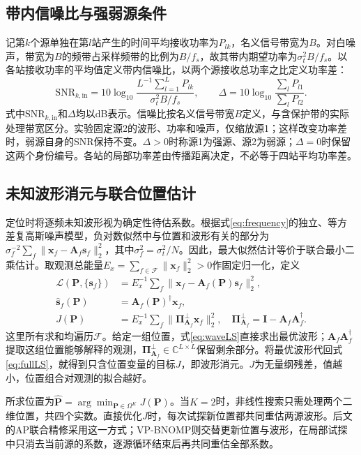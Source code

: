 \documentclass[a4paper,fleqn]{cas-sc}
\numberwithin{equation}{section}
\numberwithin{figure}{section}
\numberwithin{table}{section}
\newcommand{\C}{\mathbb C}
\begin{document}
\subsection{带内信噪比与强弱源条件}
记第$k$个源单独在第$l$站产生的时间平均接收功率为$P_{lk}$，名义信号带宽为$B$。对白噪声，带宽为$B$的频带占采样频带的比例为$B/f_s$，故其带内期望功率为$\sigma_t^2B/f_s$。以各站接收功率的平均值定义带内信噪比，以两个源接收总功率之比定义功率差：
\begin{equation}
 \mathrm{SNR}_{k,\mathrm{in}}
 =10\log_{10}\frac{L^{-1}\sum_{l=1}^L P_{lk}}
 {\sigma_t^2B/f_s},\qquad
 \Delta=10\log_{10}\frac{\sum_l P_{l1}}{\sum_l P_{l2}} .
 \label{eq:snr}
\end{equation}
式中$\mathrm{SNR}_{k,\mathrm{in}}$和$\Delta$均以dB表示。信噪比按名义信号带宽$B$定义，与含保护带的实际处理带宽区分。实验固定源2的波形、功率和噪声，仅缩放源1；这样改变功率差时，弱源自身的SNR保持不变。$\Delta>0$时称源1为强源、源2为弱源；$\Delta=0$时保留这两个身份编号。各站的局部功率差由传播距离决定，不必等于四站平均功率差。

\subsection{未知波形消元与联合位置估计}
定位时将逐频未知波形视为确定性待估系数。根据式\eqref{eq:frequency}的独立、等方差复高斯噪声模型，负对数似然中与位置和波形有关的部分为$\sigma_f^{-2}\sum_f\|\bm x_f-\bm A_f\bm s_f\|_2^2$，其中$\sigma_f^2=\sigma_t^2/N$。因此，最大似然估计等价于联合最小二乘估计\cite{ChenHudsonYao2002}。取观测总能量$E_x=\sum_{f\in\mathcal F}\|\bm x_f\|_2^2>0$作固定归一化，定义
\begin{align}
 \mathcal L(\bm P,\{\bm s_f\})
   &=E_x^{-1}\sum_f\|\bm x_f-\bm A_f(\bm P)\bm s_f\|_2^2,\label{eq:fullLS}\\
 \widehat{\bm s}_f(\bm P)&=\bm A_f(\bm P)^\dagger\bm x_f,\label{eq:waveLS}\\
 J(\bm P)&=E_x^{-1}\sum_f\|\bm\Pi_{\bm A_f}^{\perp}\bm x_f\|_2^2,
 \quad \bm\Pi_{\bm A_f}^{\perp}=\bm I-\bm A_f\bm A_f^\dagger .\label{eq:profile}
\end{align}
这里所有求和均遍历$\mathcal F$。给定一组位置，式\eqref{eq:waveLS}直接求出最优波形；$\bm A_f\bm A_f^\dagger$提取这组位置能够解释的观测，$\bm\Pi_{\bm A_f}^{\perp}\in\C^{L\times L}$保留剩余部分。将最优波形代回式\eqref{eq:fullLS}，就得到只含位置变量的目标$J$，即波形消元\cite{GolubPereyra1973}。$J$为无量纲残差，值越小，位置组合对观测的拟合越好。

所求位置为$\widehat{\bm P}=\arg\min_{\bm P\in\Omega^K}J(\bm P)$。当$K=2$时，非线性搜索只需处理两个二维位置，共四个实数。直接优化$J$时，每次试探新位置都共同重估两源波形。后文的AP联合精修采用这一方式；VP-BNOMP则交替更新位置与波形，在局部试探中只消去当前源的系数，逐源循环结束后再共同重估全部系数。
\end{document}
